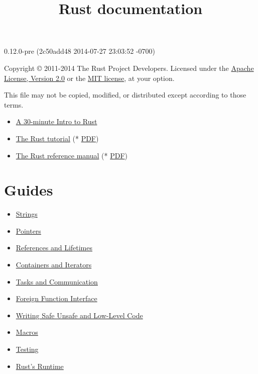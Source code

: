 \documentclass[]{article}
\title{Rust documentation}
\begin{document}
\maketitle

0.12.0-pre (2c50add48 2014-07-27 23:03:52 -0700)

Copyright © 2011-2014 The Rust Project Developers. Licensed under the
\href{http://www.apache.org/licenses/LICENSE-2.0}{Apache License,
Version 2.0} or the \href{http://opensource.org/licenses/MIT}{MIT
license}, at your option.

This file may not be copied, modified, or distributed except according
to those terms.

{
\hypersetup{linkcolor=black}
\setcounter{tocdepth}{3}
\tableofcontents
}
\begin{itemize}
\itemsep1pt\parskip0pt
\item
  \href{intro.html}{A 30-minute Intro to Rust}
\item
  \href{tutorial.html}{The Rust tutorial} (* \href{tutorial.pdf}{PDF})
\item
  \href{rust.html}{The Rust reference manual} (* \href{rust.pdf}{PDF})
\end{itemize}

\section{Guides}\label{guides}

\begin{itemize}
\itemsep1pt\parskip0pt
\item
  \href{guide-strings.html}{Strings}
\item
  \href{guide-pointers.html}{Pointers}
\item
  \href{guide-lifetimes.html}{References and Lifetimes}
\item
  \href{guide-container.html}{Containers and Iterators}
\item
  \href{guide-tasks.html}{Tasks and Communication}
\item
  \href{guide-ffi.html}{Foreign Function Interface}
\item
  \href{guide-unsafe.html}{Writing Safe Unsafe and Low-Level Code}
\item
  \href{guide-macros.html}{Macros}
\item
  \href{guide-testing.html}{Testing}
\item
  \href{guide-runtime.html}{Rust's Runtime}
\end{itemize}
\end{document}
